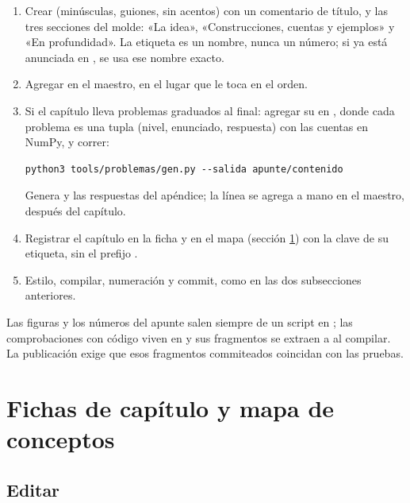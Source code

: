 \documentclass[11pt,a4paper]{report}
\newcommand{\clave}[1]{\texttt{\detokenize{#1}}}
\begin{document}
\begin{enumerate}
  \item Crear  (minúsculas, guiones, sin acentos) con un comentario de título, \clave{\chapter{...}\label{cap:<clave>}} y las tres secciones del molde: «La idea», «Construcciones, cuentas y ejemplos» y «En profundidad». La etiqueta es un nombre, nunca un número; si ya está anunciada en , se usa ese nombre exacto.
  \item Agregar \clave{} en el maestro, en el lugar que le toca en el orden.
  \item Si el capítulo lleva problemas graduados al final: agregar su \clave{C[n] = ("Título", [...])} en , donde cada problema es una tupla (nivel, enunciado, respuesta) con las cuentas en NumPy, y correr:
\begin{lstlisting}[style=terminal]
python3 tools/problemas/gen.py --salida apunte/contenido
\end{lstlisting}
  Genera  y las respuestas del apéndice; la línea \clave{} se agrega a mano en el maestro, después del capítulo.
  \item Registrar el capítulo en la ficha y en el mapa (sección \ref{sec:fichas}) con la clave de su etiqueta, sin el prefijo \clave{cap:}.
  \item Estilo, compilar, numeración y commit, como en las dos subsecciones anteriores.
\end{enumerate}

Las figuras y los números del apunte salen siempre de un script en ; las comprobaciones con código viven en  y sus fragmentos se extraen a  al compilar. La publicación exige que esos fragmentos commiteados coincidan con las pruebas.

\section{Fichas de capítulo y mapa de conceptos}\label{sec:fichas}

\subsection{Editar}
\end{document}

